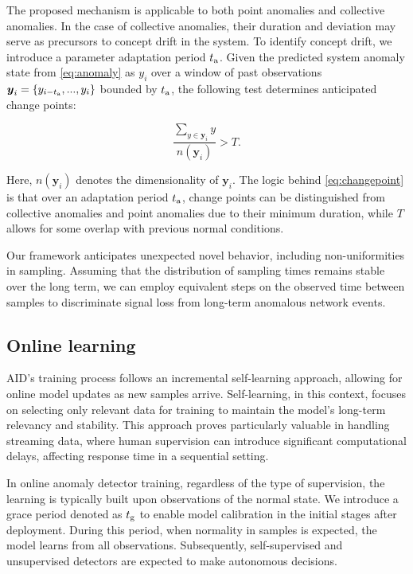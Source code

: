 The proposed mechanism is applicable to both point anomalies and collective anomalies. In the case of collective anomalies, their duration and deviation may serve as precursors to concept drift in the system. To identify concept drift, we introduce a parameter adaptation period $t _{\text{a}}$. Given the predicted system anomaly state from \eqref{eq:anomaly} as $y_i$ over a window of past observations \(\boldsymbol{y}_i=\{y_{i-t _{\text{a}}},...,y_{i}\}\) bounded by $t _{\text{a}}$, the following test determines anticipated change points:

\begin{equation}
  {\frac{\sum_{y\in \boldsymbol{y}_i}y}{n(\boldsymbol{y}_i)}} > T\text{.}\label{eq:changepoint}
\end{equation}

Here, \(n(\boldsymbol{y}_i)\) denotes the dimensionality of \(\boldsymbol{y}_i\). The logic behind \eqref{eq:changepoint} is that over an adaptation period $t _{\text{a}}$, change points can be distinguished from collective anomalies and point anomalies due to their minimum duration, while $T$ allows for some overlap with previous normal conditions.

Our framework anticipates unexpected novel behavior, including non-uniformities in sampling. Assuming that the distribution of sampling times remains stable over the long term, we can employ equivalent steps on the observed time between samples to discriminate signal loss from long-term anomalous network events.

\subsection{Online learning}\label{train}
AID's training process follows an incremental self-learning approach, allowing for online model updates as new samples arrive. Self-learning, in this context, focuses on selecting only relevant data for training to maintain the model's long-term relevancy and stability. This approach proves particularly valuable in handling streaming data, where human supervision can introduce significant computational delays, affecting response time in a sequential setting.

In online anomaly detector training, regardless of the type of supervision, the learning is typically built upon observations of the normal state. We introduce a grace period denoted as $t _{\text{g}}$ to enable model calibration in the initial stages after deployment. During this period, when normality in samples is expected, the model learns from all observations. Subsequently, self-supervised and unsupervised detectors are expected to make autonomous decisions.

